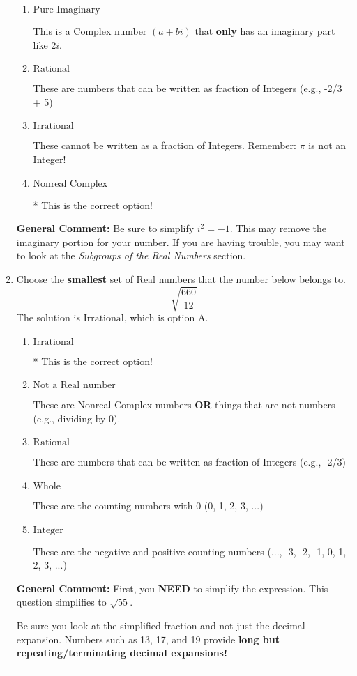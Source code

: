 \documentclass{extbook}[14pt]
\newcommand{\litem}[1]{\item #1

\rule{\textwidth}{0.4pt}}
\begin{document}
\begin{enumerate}
{\begin{enumerate}[label=\Alph*.]
This is not a number. The only non-Complex number we know is dividing by 0 as this is not a number!
\item \( \text{Pure Imaginary} \)

This is a Complex number $(a+bi)$ that \textbf{only} has an imaginary part like $2i$.
\item \( \text{Rational} \)

These are numbers that can be written as fraction of Integers (e.g., -2/3 + 5)
\item \( \text{Irrational} \)

These cannot be written as a fraction of Integers. Remember: $\pi$ is not an Integer!
\item \( \text{Nonreal Complex} \)

* This is the correct option!
\end{enumerate}

\textbf{General Comment:} Be sure to simplify $i^2 = -1$. This may remove the imaginary portion for your number. If you are having trouble, you may want to look at the \textit{Subgroups of the Real Numbers} section.
}
\litem{
Choose the \textbf{smallest} set of Real numbers that the number below belongs to.
\[ \sqrt{\frac{660}{12}} \]
The solution is \( \text{Irrational} \), which is option A.\begin{enumerate}[label=\Alph*.]
\item \( \text{Irrational} \)

* This is the correct option!
\item \( \text{Not a Real number} \)

These are Nonreal Complex numbers \textbf{OR} things that are not numbers (e.g., dividing by 0).
\item \( \text{Rational} \)

These are numbers that can be written as fraction of Integers (e.g., -2/3)
\item \( \text{Whole} \)

These are the counting numbers with 0 (0, 1, 2, 3, ...)
\item \( \text{Integer} \)

These are the negative and positive counting numbers (..., -3, -2, -1, 0, 1, 2, 3, ...)
\end{enumerate}

\textbf{General Comment:} First, you \textbf{NEED} to simplify the expression. This question simplifies to $\sqrt{55}$. 
 
 Be sure you look at the simplified fraction and not just the decimal expansion. Numbers such as 13, 17, and 19 provide \textbf{long but repeating/terminating decimal expansions!} 
 
}
\end{enumerate}
\end{document}

